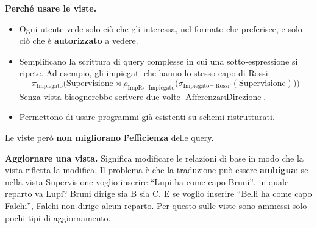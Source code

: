 \documentclass[12pt]{extarticle}
\begin{document}
\noindent \textbf{Perché usare le viste.}
\begin{itemize}
    \item Ogni utente vede solo ciò che gli interessa, nel formato che preferisce, e solo ciò che è \textbf{autorizzato} a vedere.
    \item Semplificano la scrittura di query complesse in cui una sotto-espressione si ripete. Ad esempio, gli impiegati che hanno lo stesso capo di Rossi:
    \[
    \pi_{\text{Impiegato}}\Big(\text{Supervisione} \bowtie \rho_{\text{ImpR} \leftarrow \text{Impiegato}}\big(\sigma_{\text{Impiegato} = \text{'Rossi'}}(\text{Supervisione})\big)\Big)
    \]
    Senza vista bisognerebbe scrivere due volte $\text{Afferenza} \bowtie \text{Direzione}$.
    \item Permettono di usare programmi già esistenti su schemi ristrutturati.
\end{itemize}
Le viste però \textbf{non migliorano l'efficienza} delle query.

\medskip
\noindent \textbf{Aggiornare una vista.} Significa modificare le relazioni di base in modo che la vista rifletta la modifica. Il problema è che la traduzione può essere \textbf{ambigua}: se nella vista Supervisione voglio inserire ``Lupi ha come capo Bruni'', in quale reparto va Lupi? Bruni dirige sia B sia C. E se voglio inserire ``Belli ha come capo Falchi'', Falchi non dirige alcun reparto. Per questo sulle viste sono ammessi solo pochi tipi di aggiornamento.
\end{document}
